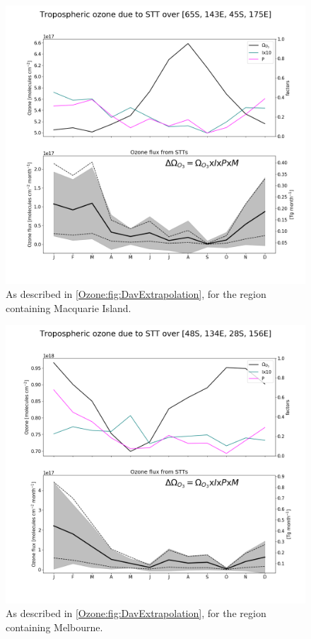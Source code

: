     \begin{figure}
      \includegraphics[width=12.0cm]{Figures/Ozone/STT_extrapolation_Mac.png}
      \caption{%
        As described in \ref{Ozone:fig:DavExtrapolation}, for the region containing Macquarie Island.}
      \label{Ozone:fig:MacExtrapolation}
    \end{figure}
    
    \begin{figure}
      \includegraphics[width=12.0cm]{Figures/Ozone/STT_extrapolation_Melb.png}
      \caption{%
        As described in \ref{Ozone:fig:DavExtrapolation}, for the region containing Melbourne.}
      \label{Ozone:fig:MelbExtrapolation}
    \end{figure}
    
